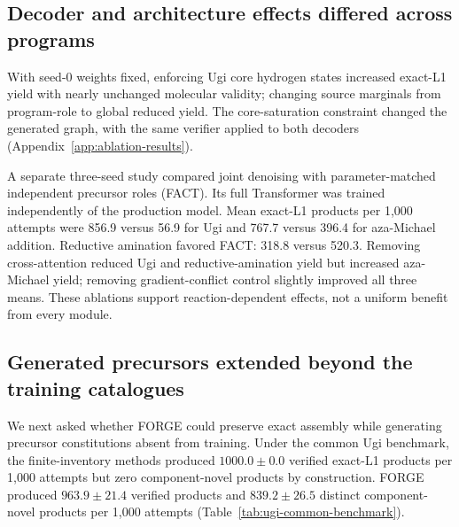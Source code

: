 \documentclass{article}
\theoremstyle{definition}
\newcommand{\ForgeProseCommonForgeComponentNovelPerThousand}{$839.2\pm26.5$}
\newcommand{\ForgeProseCommonForgeExactPerThousand}{$963.9\pm21.4$}
\newcommand{\ForgeProseCommonSelectorExactPerThousand}{$1000.0\pm0.0$}
\newcommand{\ForgeProseMechanismFactMatchedBL}{396.4}
\newcommand{\ForgeProseMechanismFactMatchedLX}{520.3}
\newcommand{\ForgeProseMechanismFactMatchedUgi}{56.9}
\newcommand{\ForgeProseMechanismFullBL}{767.7}
\newcommand{\ForgeProseMechanismFullLX}{318.8}
\newcommand{\ForgeProseMechanismFullUgi}{856.9}
\begin{document}
\subsection{Decoder and architecture effects differed across programs}
With seed-0 weights fixed, enforcing Ugi core hydrogen states increased exact-L1 yield with nearly
unchanged molecular validity; changing source marginals from program-role to global reduced yield.
The core-saturation constraint changed the generated graph, with the same verifier applied to both
decoders (Appendix~\ref{app:ablation-results}).

A separate three-seed study compared joint denoising with parameter-matched independent precursor
roles (FACT). Its full Transformer was trained independently of the production model. Mean exact-L1
products per 1,000 attempts were \ForgeProseMechanismFullUgi{} versus
\ForgeProseMechanismFactMatchedUgi{} for Ugi and \ForgeProseMechanismFullBL{} versus
\ForgeProseMechanismFactMatchedBL{} for aza-Michael addition. Reductive amination favored FACT:
\ForgeProseMechanismFullLX{} versus \ForgeProseMechanismFactMatchedLX{}. Removing cross-attention reduced Ugi and reductive-amination yield but
increased aza-Michael yield; removing gradient-conflict control slightly improved all three means.
These ablations support reaction-dependent effects, not a uniform benefit from every module.

\subsection{Generated precursors extended beyond the training catalogues}
We next asked whether FORGE could preserve exact assembly while generating precursor constitutions
absent from training. Under the common Ugi benchmark, the finite-inventory methods produced
\ForgeProseCommonSelectorExactPerThousand{} verified exact-L1 products per 1,000 attempts but zero
component-novel products by construction. FORGE produced
\ForgeProseCommonForgeExactPerThousand{} verified products and
\ForgeProseCommonForgeComponentNovelPerThousand{} distinct component-novel products per 1,000 attempts
(Table~\ref{tab:ugi-common-benchmark}).
\end{document}
